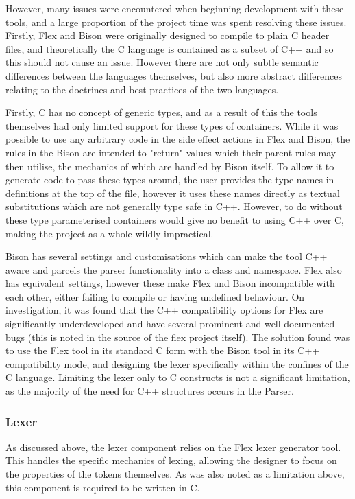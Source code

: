 \documentclass[11pt]{article}
\begin{document}
However, many issues were encountered when beginning development with these tools, and a large proportion of the project time was spent resolving these issues. Firstly, Flex and Bison were originally designed to compile to plain C header files, and theoretically the C language is contained as a subset of C++ and so this should not cause an issue. However there are not only subtle semantic differences between the languages themselves, but also more abstract differences relating to the doctrines and best practices of the two languages.

Firstly, C has no concept of generic types, and as a result of this the tools themselves had only limited support for these types of containers. While it was possible to use any arbitrary code in the side effect actions in Flex and Bison, the rules in the Bison are intended to "return" values which their parent rules may then utilise, the mechanics of which are handled by Bison itself. To allow it to generate code to pass these types around, the user provides the type names in definitions at the top of the file, however it uses these names directly as textual substitutions which are not generally type safe in C++. However, to do without these type parameterised containers would give no benefit to using C++ over C, making the project as a whole wildly impractical.

Bison has several settings and customisations which can make the tool C++ aware and parcels the parser functionality into a class and namespace. Flex also has equivalent settings, however these make Flex and Bison incompatible with each other, either failing to compile or having undefined behaviour. On investigation, it was found that the C++ compatibility options for Flex are significantly underdeveloped and have several prominent and well documented bugs (this is noted in the source of the flex project itself). The solution found was to use the Flex tool in its standard C form with the Bison tool in its C++ compatibility mode, and designing the lexer specifically within the confines of the C language. Limiting the lexer only to C constructs is not a significant limitation, as the majority of the need for C++ structures occurs in the Parser.

\subsubsection{Lexer}

As discussed above, the lexer component relies on the Flex lexer generator tool. This handles the specific mechanics of lexing, allowing the designer to focus on the properties of the tokens themselves. As was also noted as a limitation above, this component is required to be written in C.
\end{document}

